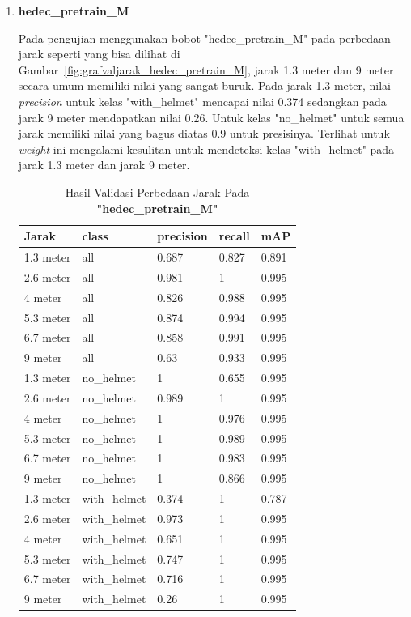 \begin{enumerate}
  \FloatBarrier
  
   
  \item \textbf{hedec\_pretrain\_M}
  
  \par Pada pengujian menggunakan bobot "hedec\_pretrain\_M" pada perbedaan jarak seperti yang bisa dilihat di Gambar~\ref{fig:grafvaljarak_hedec_pretrain_M}, jarak 1.3 meter dan 9 meter
  secara umum memiliki nilai yang sangat buruk. Pada jarak 1.3 meter, nilai \emph{precision} untuk kelas "with\_helmet"
  mencapai nilai 0.374 sedangkan pada jarak 9 meter mendapatkan nilai 0.26. Untuk kelas "no\_helmet" untuk semua jarak memiliki
  nilai yang bagus diatas 0.9 untuk presisinya. Terlihat untuk \emph{weight} ini mengalami kesulitan untuk mendeteksi
  kelas "with\_helmet" pada jarak 1.3 meter dan  jarak 9 meter.


  \begin{longtable}{|l|l|l|l|l|} 
    \caption{Hasil Validasi Perbedaan Jarak Pada \textbf{"hedec\_pretrain\_M"}}
    \label{tb:hasiljarak_hedec_pretrain_M}\\
    \hline
    Jarak     & class        & precision & recall & mAP    \\ 
    \hline
    \endhead
    1.3 meter & all          & 0.687     & 0.827  & 0.891  \\
    2.6 meter & all          & 0.981     & 1      & 0.995  \\
    4 meter   & all          & 0.826     & 0.988  & 0.995  \\
    5.3 meter & all          & 0.874     & 0.994  & 0.995  \\
    6.7 meter & all          & 0.858     & 0.991  & 0.995  \\
    9 meter   & all          & 0.63      & 0.933  & 0.995  \\
    1.3 meter & no\_helmet   & 1         & 0.655  & 0.995  \\
    2.6 meter & no\_helmet   & 0.989     & 1      & 0.995  \\
    4 meter   & no\_helmet   & 1         & 0.976  & 0.995  \\
    5.3 meter & no\_helmet   & 1         & 0.989  & 0.995  \\
    6.7 meter & no\_helmet   & 1         & 0.983  & 0.995  \\
    9 meter   & no\_helmet   & 1         & 0.866  & 0.995  \\
    1.3 meter & with\_helmet & 0.374     & 1      & 0.787  \\
    2.6 meter & with\_helmet & 0.973     & 1      & 0.995  \\
    4 meter   & with\_helmet & 0.651     & 1      & 0.995  \\
    5.3 meter & with\_helmet & 0.747     & 1      & 0.995  \\
    6.7 meter & with\_helmet & 0.716     & 1      & 0.995  \\
    9 meter   & with\_helmet & 0.26      & 1      & 0.995  \\
    \hline
  \end{longtable}




\end{enumerate}

